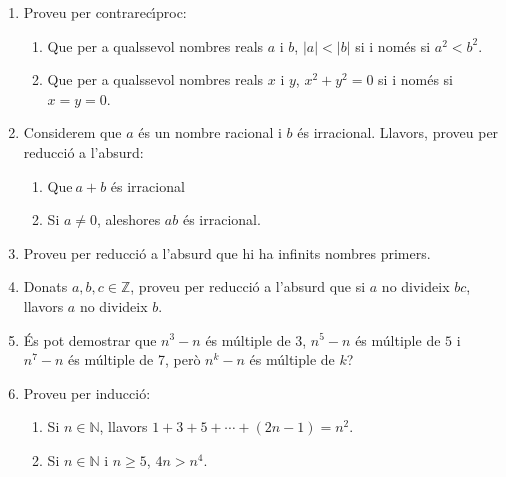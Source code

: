 \begin{enumerate}
\begin{enumerate}
\item Que qualsevol enter divideix zero.

\item Que per a tots $x,y\in\mathbb{R}$, $xy=0$ si i nom\'{e}s si $x=0$ o
$y=0$.
\end{enumerate}

\item Proveu per contrarec\'{\i}proc:

\begin{enumerate}
\item Que per a qualssevol nombres reals $a$ i $b$, $\left\vert a\right\vert
<\left\vert b\right\vert $ si i nom\'{e}s si $a^{2}<b^{2}$.

\item Que per a qualssevol nombres reals $x$ i $y$, $x^{2}+y^{2}=0$ si i
nom\'{e}s si $x=y=0$.
\end{enumerate}

\item Considerem que $a$ \'{e}s un nombre racional i $b$ \'{e}s irracional.
Llavors, proveu per reducci\'{o} a l'absurd:

\begin{enumerate}
\item Que$~a+b$ \'{e}s irracional

\item Si $a\neq0$, aleshores $ab$ \'{e}s irracional.
\end{enumerate}

\item Proveu per reducci\'{o} a l'absurd que hi ha infinits nombres primers.

\item Donats $a,b,c\in\mathbb{Z}$, proveu per reducci\'{o} a l'absurd que si
$a$ no divideix $bc$, llavors $a$ no divideix $b$.

\item \'{E}s pot demostrar que $n^{3}-n$ \'{e}s m\'{u}ltiple de 3, $n^{5}-n$
\'{e}s m\'{u}ltiple de $5$ i $n^{7}-n$ \'{e}s m\'{u}ltiple de 7, per\`{o}
$n^{k}-n$ \'{e}s m\'{u}ltiple de $k$?

\item Proveu per inducci\'{o}:

\begin{enumerate}
\item Si $n\in\mathbb{N}$, llavors $1+3+5+\cdots+\left(  2n-1\right)  =n^{2}$.

\item Si $n\in\mathbb{N}$ i $n\geq5$, $4n>n^{4}$.


\end{enumerate}
\end{enumerate}
